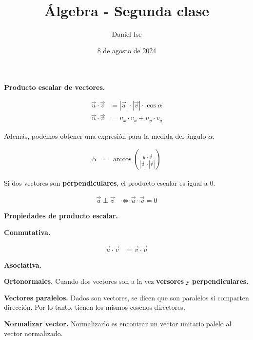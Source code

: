 \documentclass{article}
\title{Álgebra - Segunda clase}
\author{Daniel Ise}
\date{8 de agosto de 2024}
\begin{document}
\maketitle

\textbf{Producto escalar de vectores.} 

\begin{align*}
\vec{u} \cdot \vec{v} &= |\vec{u}| \cdot |\vec{v}| \cdot \cos \alpha \\
\vec{u} \cdot \vec{v} &= u_x \cdot v_x + u_y \cdot v_y
\end{align*}

Además, podemos obtener una expresión para la medida del ángulo $\alpha$.

\begin{align*}
    \alpha &= \arccos \left(\frac{\vec{u} \cdot \vec{v}}{|\vec{u}| \cdot |\vec{v}|}\right)
\end{align*}

Si dos vectores son \textbf{perpendiculares}, el producto escalar es igual a 0.

\begin{align*}
    \vec{u} \perp \vec{v} &\iff \vec{u} \cdot \vec{v} = 0
\end{align*}

\textbf{Propiedades de producto escalar. }

\textbf{Conmutativa. }

\begin{align*}
    \vec{u} \cdot \vec{v} &= \vec{v} \cdot \vec{u}
\end{align*}

\textbf{Asociativa. }

\textbf{Ortonormales. } Cuando dos vectores son a la vez \textbf{versores} y 
\textbf{perpendiculares.}

\textbf{Vectores paralelos. } Dados son vectores, se dicen que son paralelos si 
comparten dirección. Por lo tanto, tienen los mismos cosenos directores.

\textbf{Normalizar vector. } Normalizarlo es encontrar un vector unitario 
palelo al vector normalizado.
\end{document}
